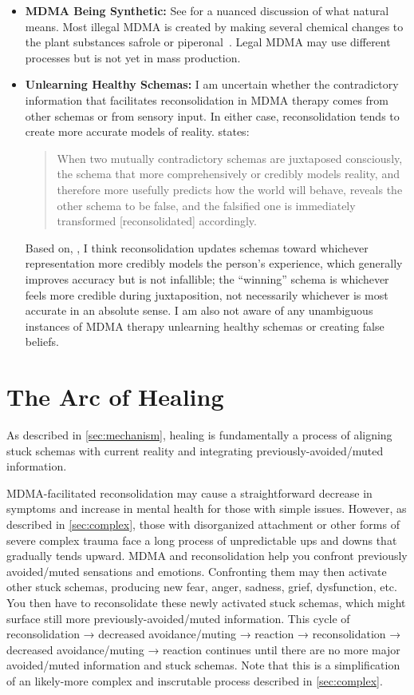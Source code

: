 \documentclass[11pt,oneside]{book}
\let\cite\parencite
\begin{document}
\begin{itemize}
    \item \textbf{MDMA Being Synthetic:}
        See \textcite{ruggeriNatural} for a nuanced discussion of what natural means. Most illegal MDMA is created by making several chemical changes to the plant substances safrole or piperonal~\cite{worldDrugReport,euMDMA}. Legal MDMA may use different processes but is not yet in mass production.
    \item \textbf{Unlearning Healthy Schemas:}
        I am uncertain whether the contradictory information that facilitates reconsolidation in MDMA therapy comes from other schemas or from sensory input. In either case, reconsolidation tends to create more accurate models of reality. \textcite[p. 28]{ecker2015misunderstood} states:
        \begin{quotation}
            When two mutually contradictory schemas are juxtaposed consciously, the schema that more comprehensively or credibly models reality, and therefore more usefully predicts how the world will behave, reveals the other schema to be false, and the falsified one is immediately transformed [reconsolidated] accordingly.
        \end{quotation}

        Based on, \textcite{eckerUnlocking}, I think reconsolidation updates schemas toward whichever representation more credibly models the person's experience, which generally improves accuracy but is not infallible; the \enquote{winning} schema is whichever feels more credible during juxtaposition, not necessarily whichever is most accurate in an absolute sense. I am also not aware of any unambiguous instances of MDMA therapy unlearning healthy schemas or creating false beliefs.
\end{itemize}

\chapter{The Arc of Healing}
\label{bigPicture}
As described in \cref{sec:mechanism}, healing is fundamentally a process of aligning stuck schemas with current reality and integrating previously-avoided/muted information.

MDMA-facilitated reconsolidation may cause a straightforward decrease in symptoms and increase in mental health for those with simple issues. However, as described in \cref{sec:complex}, those with disorganized attachment or other forms of severe complex trauma face a long process of unpredictable ups and downs that gradually tends upward. MDMA and reconsolidation help you confront previously avoided/muted sensations and emotions. Confronting them may then activate other stuck schemas, producing new fear, anger, sadness, grief, dysfunction, etc. You then have to reconsolidate these newly activated stuck schemas, which might surface still more previously-avoided/muted information. This cycle of reconsolidation → decreased avoidance/muting → reaction → reconsolidation → decreased avoidance/muting → reaction continues until there are no more major avoided/muted information and stuck schemas. Note that this is a simplification of an likely-more complex and inscrutable process described in \cref{sec:complex}.
\end{document}
